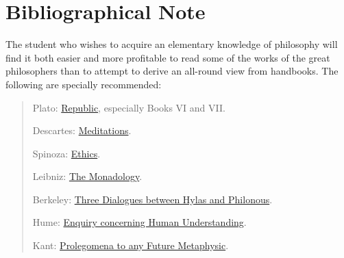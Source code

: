 \documentclass[oneside,letterpaper,12pt]{book}
\begin{document}
\hypertarget{bibliographical-note}{%
	\chapter*{Bibliographical Note}\label{bibliographical-note}}

The student who wishes to acquire an elementary knowledge of philosophy
will find it both easier and more profitable to read some of the works
of the great philosophers than to attempt to derive an all-round view
from handbooks. The following are specially recommended:

\begin{quote}
	Plato: \href{https://archive.org/details/republicofpl1897plat}{Republic}, especially Books VI and VII.
	
	Descartes: \href{https://archive.org/details/methodmeditation00descuoft}{Meditations}.
	
	Spinoza: \href{https://archive.org/details/spinozahandbookt00pictuoft}{Ethics}.
	
	Leibniz: \href{https://archive.org/details/cu31924016874038}{The Monadology}.
	
	Berkeley: \href{https://archive.org/details/threedialoguesbe00berkiala}{Three Dialogues between Hylas and Philonous}.
	
	Hume: \href{https://archive.org/details/enquiryconcernin01hume}{Enquiry concerning Human Understanding}.
	
	Kant: \href{https://archive.org/details/kantsprolegome00kant}{Prolegomena to any Future Metaphysic}.
\end{quote}

\backmatter
\end{document}
